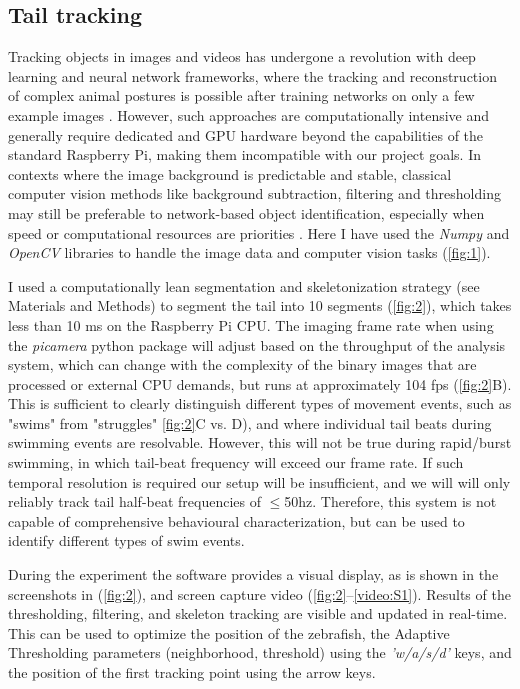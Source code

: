 \documentclass[9pt,lineno]{RandlettLab_elife}
\begin{document}
\subsection{Tail tracking}

Tracking objects in images and videos has undergone a revolution with deep learning and neural network frameworks, where the tracking and reconstruction of complex animal postures is possible after training networks on only a few example images \citep{Mathis2018-rw, Pereira2022-rd}. However, such approaches are computationally intensive and generally require dedicated and GPU hardware beyond the capabilities of the standard Raspberry Pi, making them incompatible with our project goals. In contexts where the image background is predictable and stable, classical computer vision methods like background subtraction, filtering and thresholding may still be preferable to network-based object identification, especially when speed or computational resources are priorities \citep{Mirat2013, Stih2019-gx, Zhu2023}. Here I have used the \emph{Numpy} \citep{harris2020array} and \emph{OpenCV} \citep{opencv_library} libraries to handle the image data and computer vision tasks (\autoref{fig:1}). 



I used a computationally lean segmentation and skeletonization strategy (see Materials and Methods) to segment the tail into 10 segments (\autoref{fig:2}), which takes less than 10 ms on the Raspberry Pi CPU. The imaging frame rate when using the \emph{picamera} python package will adjust based on the throughput of the analysis system, which can change with the complexity of the binary images that are processed or external CPU demands, but runs at approximately 104 fps (\autoref{fig:2}B). This is sufficient to clearly distinguish different types of movement events, such as "swims" from "struggles" \autoref{fig:2}C vs. D), and where individual tail beats during swimming events are resolvable. However, this will not be true during rapid/burst swimming, in which tail-beat frequency will exceed our frame rate. If such temporal resolution is required our setup will be insufficient, and we will will only reliably track tail half-beat frequencies of $\leq$50hz. Therefore, this system is not capable of comprehensive behavioural characterization, but can be used to identify different types of swim events. 

During the experiment the software provides a visual display, as is shown in the screenshots in (\autoref{fig:2}), and screen capture video (\autoref{fig:2}--\autoref{video:S1}). Results of the thresholding, filtering, and skeleton tracking are visible and updated in real-time. This can be used to optimize the position of the zebrafish, the Adaptive Thresholding parameters (neighborhood, threshold) using the \emph{'w/a/s/d'} keys, and the position of the first tracking point using the arrow keys.
\end{document}
